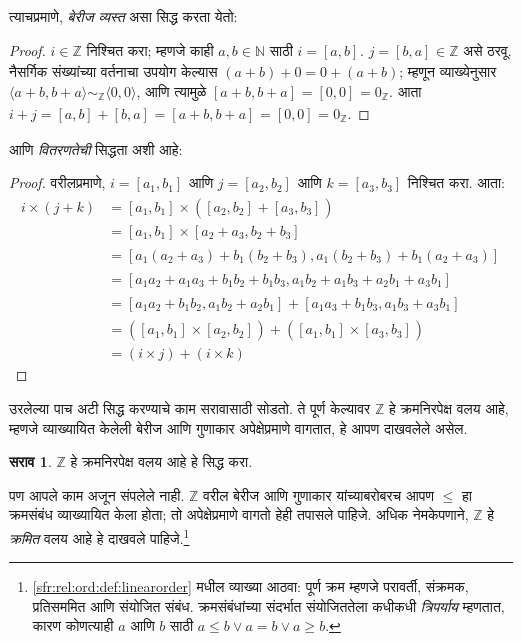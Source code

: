 \documentclass[11pt,a4paper,openany]{book}
\theoremstyle{definition}
\newtheorem{prob}{सराव}[chapter]
\newcommand{\tuple}[1]{\langle #1\rangle}
\newcommand{\Nat}{\mathbb{N}}
\newcommand{\Int}{\mathbb{Z}}
\newcommand{\equivrep}[2]{[#1]_{#2}}
\begin{document}
त्याचप्रमाणे, \emph{बेरीज व्यस्त} असा सिद्ध करता येतो:

\begin{proof}
$i \in \Int$ निश्चित करा; म्हणजे काही $a,b \in \Nat$ साठी $i =
\equivrep{a,b}{}$. $j = \equivrep{b,a}{} \in \Int$ असे ठरवू. नैसर्गिक
संख्यांच्या वर्तनाचा उपयोग केल्यास $(a+b) + 0 = 0 + (a+b)$; म्हणून
व्याख्येनुसार $\tuple{a+b, b+a} \sim_\Int \tuple{0,0}$, आणि त्यामुळे
$\equivrep{a+b, b+a}{} = \equivrep{0, 0}{} = 0_\Int$. आता $i + j =
\equivrep{a,b}{}+\equivrep{b,a}{}=\equivrep{a+b, b+a}{}= \equivrep{0,
0}{} = 0_\Int$.
\end{proof}

आणि \emph{वितरणतेची} सिद्धता अशी आहे:

\begin{proof}
वरीलप्रमाणे, $i = \equivrep{a_1, b_1}{}$ आणि $j =
\equivrep{a_2,b_2}{}$ आणि $k = \equivrep{a_3, b_3}{}$ निश्चित करा. आता:
\begin{align*}
	i \times (j + k)
	&= \equivrep{a_1, b_1}{} \times (\equivrep{a_2,b_2}{} + \equivrep{a_3, b_3}{})\\
	&= \equivrep{a_1, b_1}{} \times \equivrep{a_2 + a_3,b_2+b_3}{}\\
	&= \equivrep{a_1  (a_2 + a_3) + b_1  (b_2+b_3), a_1  (b_2 + b_3) + b_1 (a_2 + a_3)}{}\\
	&= \equivrep{a_1 a_2 + a_1a_3 + b_1 b_2+b_1b_3, a_1 b_2 + a_1b_3 + a_2b_1 + a_3b_1}{}\\
	&= \equivrep{a_1a_2 + b_1b_2, a_1b_2 + a_2b_1}{} + \equivrep{a_1a_3 + b_1b_3, a_1b_3 + a_3b_1}{}\\
	&= (\equivrep{a_1, b_1}{} \times \equivrep{a_2,b_2}{}) + (\equivrep{a_1, b_1}{} \times  \equivrep{a_3, b_3}{})\\
	&= (i \times j) + (i \times k)
\end{align*}
\end{proof}

उरलेल्या पाच अटी सिद्ध करण्याचे काम सरावासाठी सोडतो. ते पूर्ण केल्यावर
$\Int$ हे क्रमनिरपेक्ष वलय आहे, म्हणजे व्याख्यायित केलेली बेरीज आणि
गुणाकार अपेक्षेप्रमाणे वागतात, हे आपण दाखवलेले असेल.

\begin{prob}
$\Int$ हे क्रमनिरपेक्ष वलय आहे हे सिद्ध करा.
\end{prob}

पण आपले काम अजून संपलेले नाही. $\Int$ वरील बेरीज आणि गुणाकार यांच्याबरोबरच
आपण $\leq$ हा क्रमसंबंध व्याख्यायित केला होता; तो अपेक्षेप्रमाणे वागतो हेही
तपासले पाहिजे. अधिक नेमकेपणाने, $\Int$ हे \emph{क्रमित} वलय आहे हे दाखवले
पाहिजे.\footnote{\ref{sfr:rel:ord:def:linearorder} मधील व्याख्या आठवा:
	पूर्ण क्रम म्हणजे परावर्ती, संक्रमक, प्रतिसममित आणि संयोजित संबंध.
	क्रमसंबंधांच्या संदर्भात संयोजिततेला कधीकधी \emph{त्रिपर्याय} म्हणतात,
	कारण कोणत्याही $a$ आणि $b$ साठी $a \leq b \lor a
	= b \lor a \geq b$.}
\end{document}
